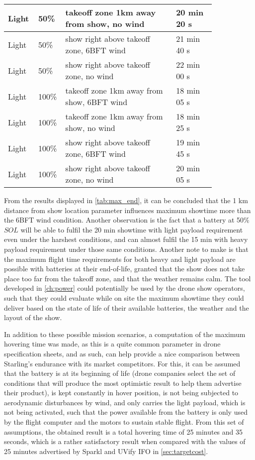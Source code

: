 \begin{table}[H]
\begin{tabular}{p{0.10\linewidth}|p{0.05\linewidth}|p{0.50\linewidth}|p{0.18\linewidth}}
        Light & 50\% & takeoff zone 1km away from show, no wind & 20 min 20 s \\ \hline
        Light & 50\% & show right above takeoff zone, 6BFT wind & 21 min 40 s \\ \hline
        Light & 50\% & show right above takeoff zone, no wind & 22 min 00 s \\ \hline \hline
        Light & 100\% & takeoff zone 1km away from show, 6BFT wind & 18 min 05 s \\ \hline
        Light & 100\% & takeoff zone 1km away from show, no wind & 18 min 25 s \\ \hline
        Light & 100\% & show right above takeoff zone, 6BFT wind & 19 min 45 s \\ \hline
        Light & 100\% & show right above takeoff zone, no wind & 20 min 05 s \\
        
    \end{tabular}
\end{table}

From the results displayed in \autoref{tab:max_end}, it can be concluded that the 1 km distance from show location parameter influences maximum showtime more than the 6BFT wind condition. Another observation is the fact that a battery at 50\% $\mathit{SOL}$ will be able to fulfil the 20 min showtime with light payload requirement even under the harshest conditions, and can almost fulfil the 15 min with heavy payload requirement under those same conditions. Another note to make is that the maximum flight time requirements for both heavy and light payload are possible with batteries at their end-of-life, granted that the show does not take place too far from the takeoff zone, and that the weather remains calm. The tool developed in \autoref{ch:power} could potentially be used by the drone show operators, such that they could evaluate while on site the maximum showtime they could deliver based on the state of life of their available batteries, the weather and the layout of the show.

In addition to these possible mission scenarios, a computation of the maximum hovering time was made, as this is a quite common parameter in drone specification sheets, and as such, can help provide a nice comparison between Starling's endurance with its market competitors. For this, it can be assumed that the battery is at its beginning of life (drone companies select the set of conditions that will produce the most optimistic result to help them advertise their product), is kept constantly in hover position, is not being subjected to aerodynamic disturbances by wind, and only carries the light payload, which is not being activated, such that the power available from the battery is only used by the flight computer and the motors to sustain stable flight. From this set of assumptions, the obtained result is a total hovering time of 25 minutes and 35 seconds, which is a rather satisfactory result when compared with the values of 25 minutes advertised by Sparkl and UVify IFO in \autoref{sec:targetcost}.

